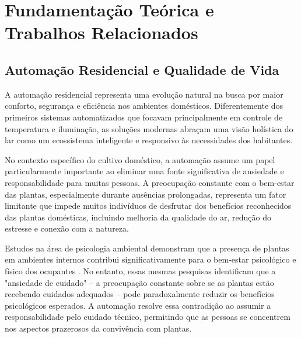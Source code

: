\documentclass[twoside,english,brazilian]{UNISINOSmonografia}
\begin{document}
\chapter{Fundamentação Teórica e Trabalhos Relacionados}

\section{Automação Residencial e Qualidade de Vida}

A automação residencial representa uma evolução natural na busca por maior conforto, segurança e eficiência nos ambientes domésticos. Diferentemente dos primeiros sistemas automatizados que focavam principalmente em controle de temperatura e iluminação, as soluções modernas abraçam uma visão holística do lar como um ecossistema inteligente e responsivo às necessidades dos habitantes.

No contexto específico do cultivo doméstico, a automação assume um papel particularmente importante ao eliminar uma fonte significativa de ansiedade e responsabilidade para muitas pessoas. A preocupação constante com o bem-estar das plantas, especialmente durante ausências prolongadas, representa um fator limitante que impede muitos indivíduos de desfrutar dos benefícios reconhecidos das plantas domésticas, incluindo melhoria da qualidade do ar, redução do estresse e conexão com a natureza.

Estudos na área de psicologia ambiental demonstram que a presença de plantas em ambientes internos contribui significativamente para o bem-estar psicológico e físico dos ocupantes \cite{silva2019}. No entanto, essas mesmas pesquisas identificam que a "ansiedade de cuidado" – a preocupação constante sobre se as plantas estão recebendo cuidados adequados – pode paradoxalmente reduzir os benefícios psicológicos esperados. A automação resolve essa contradição ao assumir a responsabilidade pelo cuidado técnico, permitindo que as pessoas se concentrem nos aspectos prazerosos da convivência com plantas.

\end{document}
